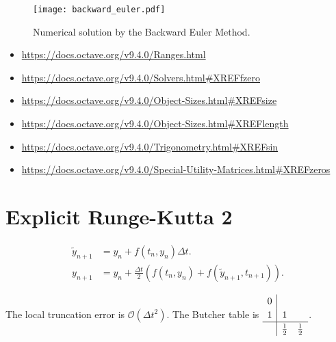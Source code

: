 \begin{figure}[ht!]
	\centering
	\texttt{[image: backward\_euler.pdf]}
	\caption{Numerical solution by the Backward Euler Method.}
\end{figure}

\begin{itemize}
	\item

	      \url{https://docs.octave.org/v9.4.0/Ranges.html}

	\item

	      \url{https://docs.octave.org/v9.4.0/Solvers.html#XREFfzero}

	\item

	      \url{https://docs.octave.org/v9.4.0/Object-Sizes.html#XREFsize}

	\item

	      \url{https://docs.octave.org/v9.4.0/Object-Sizes.html#XREFlength}

	\item

	      \url{https://docs.octave.org/v9.4.0/Trigonometry.html#XREFsin}

	\item

	      \url{https://docs.octave.org/v9.4.0/Special-Utility-Matrices.html#XREFzeros}
\end{itemize}


\section{Explicit Runge-Kutta 2}
\begin{align*}
	\widetilde{y}_{n+1} & =
	y_{n}+
	f\left(t_{n},y_{n}\right)\Delta t. \\
	y_{n+1}             & =
	y_{n}+
	\frac{\Delta t}{2}
	\left(
	f\left(t_{n},y_{n}\right)+
	f\left(\widetilde{y}_{n+1},t_{n+1}\right)
	\right).
\end{align*}

The local truncation error is
\begin{math}
	\mathcal{O}
	\left(\Delta t^{2}\right)
\end{math}.
The Butcher table is
\begin{math}
	\renewcommand\arraystretch{1.2}
	\begin{array}
		{c|cc}
		0 &             &             \\
		1 & 1           &             \\
		\hline
		  & \frac{1}{2} & \frac{1}{2}
	\end{array}
\end{math}.

